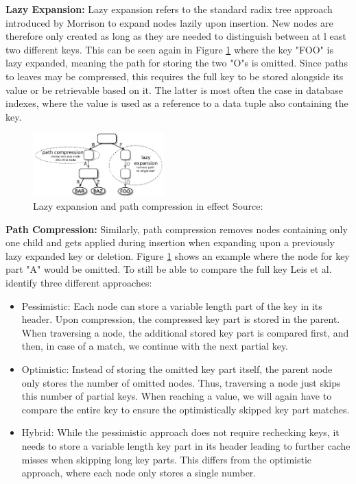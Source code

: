 \documentclass[acmtog, nonacm]{acmart}
\begin{document}
\textbf{Lazy Expansion:} 
Lazy expansion refers to the standard radix tree approach introduced by Morrison \cite{10.1145/321479.321481} to 
expand nodes lazily upon insertion. New nodes are therefore only created as long as they are needed to distinguish between at l
east two different keys. This can be seen
again in Figure \ref{fig:art-vertical-compression} where the key "FOO" is lazy expanded, meaning the path for storing the
two "O"s is omitted. Since paths to leaves may be compressed, this requires the full key to be stored alongside its value 
or be retrievable based on it. The latter is most often the case in database indexes, where the value 
is used as a reference to a data tuple also containing the key.

\begin{figure}
    \centering
    \includegraphics[width=0.45\textwidth]{images/04-art-vertical-compression.PNG}
    \caption{Lazy expansion and path compression in effect
    Source: \cite{6544812}}
    \label{fig:art-vertical-compression}
\end{figure}

\textbf{Path Compression:}
Similarly, path compression removes nodes containing only one child and gets applied during insertion when expanding 
upon a previously lazy expanded key or deletion. Figure \ref{fig:art-vertical-compression} shows an example where 
the node for key part "A" would be omitted. To still be able to compare the full key Leis et al. identify three different approaches:
\begin{itemize}
    \item Pessimistic: Each node can store a variable length part of the key in its header. 
    Upon compression, the compressed key part is stored in the parent. When traversing a node, the additional
    stored key part is compared first, and then, in case of a match, we continue with the next partial key.
    \item Optimistic: Instead of storing the omitted key part itself, the parent node only stores the number of 
    omitted nodes. Thus, traversing a node just skips this number of partial keys. When reaching a value, we will 
    again have to compare the entire key to ensure the optimistically skipped key part matches.
    \item Hybrid: While the pessimistic approach does not require rechecking keys, it needs to store a variable length 
    key part in its header leading to further cache misses when skipping long key parts. This differs from the 
    optimistic approach, where each node only stores a single number.
\end{itemize}
\end{document}
